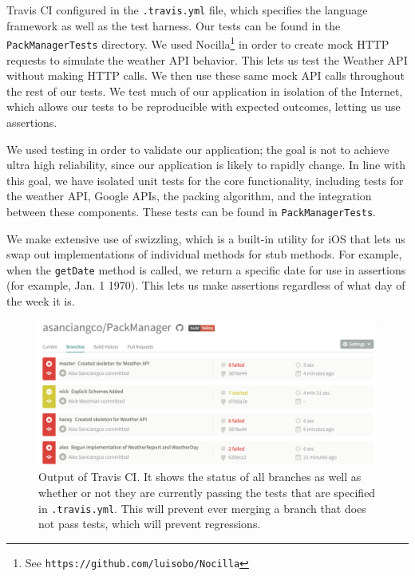 \documentclass[11pt]{article}
\begin{document}
Travis CI configured in the \texttt{.travis.yml} file, which specifies the language framework as well as the test harness. Our tests can be found in the \texttt{PackManagerTests} directory. We used Nocilla\footnote{See \texttt{https://github.com/luisobo/Nocilla}} in order to create mock HTTP requests to simulate the weather API behavior. This lets us test the Weather API without making HTTP calls. We then use these same mock API calls throughout the rest of our tests. We test much of our application in isolation of the Internet, which allows our tests to be reproducible with expected outcomes, letting us use assertions.

We used testing in order to validate our application; the goal is not to achieve ultra high reliability, since our application is likely to rapidly change. In line with this goal, we have isolated unit tests for the core functionality, including tests for the weather API, Google APIs, the packing algorithm, and the integration between these components. These tests can be found in \texttt{PackManagerTests}. 

We make extensive use of swizzling, which is a built-in utility for iOS that lets us swap out implementations of individual methods for stub methods. For example, when the \texttt{getDate} method is called, we return a specific date for use in assertions (for example, Jan. 1 1970). This lets us make assertions regardless of what day of the week it is.




\begin{figure}
\centering
\includegraphics[width=\linewidth]{img/travis.png}
\caption{Output of Travis CI. It shows the status of all branches as well as whether or not they are currently passing the tests that are specified in \texttt{.travis.yml}. This will prevent ever merging a branch that does not pass tests, which will prevent regressions.}
\label{fig:travis}
\end{figure}
\end{document}
